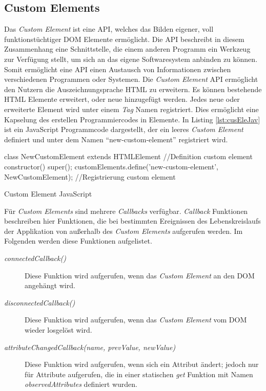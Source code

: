 \documentclass[12pt, paper=a4, bibtotoc, toc=listof, headsepline=true]{scrreprt}
\begin{document}
		\subsection{Custom Elements}
		Das \emph{Custom Element} ist eine \ac{API}, welches das Bilden eigener, voll funktionstüchtiger \ac{DOM} Elemente ermöglicht\cite{Denicola2016}. Die \ac{API} beschreibt in diesem Zusammenhang eine Schnittstelle, die einem anderen Programm ein Werkzeug zur Verfügung stellt, um sich an das eigene Softwaresystem anbinden zu können\cite{Behrendt2016}. Somit ermöglicht eine \ac{API} einen Austausch von Informationen zwischen verschiedenen Programmen oder Systemen.	
		Die \emph{Custom Element} \ac{API} ermöglicht den Nutzern die Auszeichnungsprache \ac{HTML} zu erweitern\cite{Argelius2016}. Es können bestehende \ac{HTML} Elemente erweitert, oder neue hinzugefügt werden. Jedes neue oder erweiterte Element wird unter einem \emph{Tag} Namen registriert. Dies ermöglicht eine Kapselung des erstellen Programmiercodes in Elemente. In Listing \ref{lst:cusEleJav} ist ein JavaScript Programmcode dargestellt, der ein leeres \emph{Custom Element} definiert und unter dem Namen \enquote{new-custom-element} registriert wird.
		\begin{listing}
			\begin{JavaScriptcode*}{}
class NewCustomElement extends HTMLElement { //Definition custom element
	constructor() {
		super();
	}
}
customElements.define('new-custom-element', NewCustomElement); //Registrierung custom element
			\end{JavaScriptcode*}
			\caption{Custom Element JavaScript}
			\label{lst:cusEleJav}
		\end{listing}
		Für \emph{Custom Elements} sind mehrere \emph{Callbacks} verfügbar. \emph{Callback} Funktionen beschreiben hier Funktionen, die bei bestimmten Ereignissen des Lebenskreislaufs der Applikation von außerhalb des \emph{Custom Elements} aufgerufen werden. Im Folgenden werden diese Funktionen aufgelistet\cite{Argelius2016}.
		\begin{description}  
			\item  [\emph{connectedCallback()}] Diese Funktion wird aufgerufen, wenn das \emph{Custom Element} an den \ac{DOM} angehängt wird.			
			\item [\emph{disconnectedCallback()}] Diese Funktion wird aufgerufen, wenn das \emph{Custom Element} vom \ac{DOM} wieder losgelöst wird. 			
			\item  [\emph{attributeChangedCallback(name, prevValue, newValue)}] Diese Funktion wird aufgerufen, wenn sich ein Attribut ändert; jedoch nur für Attribute aufgerufen, die in einer statischen \emph{get} Funktion mit Namen \emph{observedAttributes} definiert wurden.
		\end{description}
\end{document}
